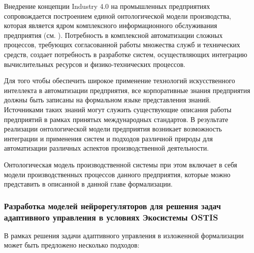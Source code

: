Внедрение концепции Industry 4.0 на промышленных предприятиях сопровождается построением единой онтологической модели производства, которая является ядром комплексного информационного обслуживания предприятия (см. ). Потребность в комплексной автоматизации сложных процессов, требующих согласованной работы множества служб и технических средств, создает потребность в разработке систем, осуществляющих интеграцию вычислительных ресурсов и физико-технических процессов.

Для того чтобы обеспечить широкое применение технологий искусственного интеллекта в автоматизации предприятия, все корпоративные знания предприятия должны быть записаны на формальном языке представления знаний. Источниками таких знаний могут служить существующие описания работы предприятий в рамках принятых международных стандартов. В результате реализации онтологической модели предприятия возникает возможность интеграции и применения систем и подходов различной природы для автоматизации различных аспектов производственной деятельности.

Онтологическая модель производственной системы при этом включает в себя модели производственных процессов данного предприятия, которые можно представить в описанной в данной главе формализации. 


\subsubsection{Разработка моделей нейрорегуляторов для решения задач адаптивного управления в условиях Экосистемы OSTIS}

В рамках решения задачи адаптивного управления в изложенной формализации может быть предложено несколько подходов:

